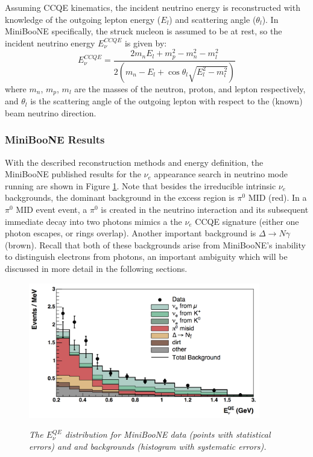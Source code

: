 Assuming CCQE kinematics, the incident neutrino energy is reconstructed with knowledge of the outgoing lepton energy ($E_l$) and scattering angle ($\theta_l$). In MiniBooNE specifically, the struck nucleon is assumed to be at rest, so the incident neutrino energy $E_\nu^{CCQE}$ is given by:
\begin{equation}\label{MB_CCQE_formula}
E_\nu^{CCQE} = \frac{2m_nE_l+m_p^2-m_n^2-m_l^2}{2(m_n-E_l+\cos\theta_l\sqrt{E_l^2-m_l^2})}
\end{equation}
where $m_n$, $m_p$, $m_l$ are the masses of the neutron, proton, and lepton respectively, and $\theta_l$ is the scattering angle of the outgoing lepton with respect to the (known) beam neutrino direction.\\

\subsubsection{MiniBooNE Results}
With the described reconstruction methods and energy definition, the MiniBooNE published results \cite{MBLEEPaper} for the $\nu_e$ appearance search in neutrino mode running are shown in Figure \ref{MB_published_stackedhisto_fig}. Note that besides the irreducible intrinsic $\nu_e$ backgrounds, the dominant background in the excess region is $\pi^0$ MID (red). In a $\pi^0$ MID event event, a $\pi^0$ is created in the neutrino interaction and its subsequent immediate decay into two photons mimics a the $\nu_e$ CCQE signature (either one photon escapes, or rings overlap). Another important background is $\Delta\rightarrow N\gamma$ (brown). Recall that both of these backgrounds arise from MiniBooNE's inability to distinguish electrons from photons, an important ambiguity which will be discussed in more detail in the following sections.\\


\begin{figure}[ht!]
\centering
	\includegraphics[width=0.9\textwidth]{Figures/MB_published_stackedhisto.png} \\
\caption{\textit{The $E_\nu^{QE}$ distribution for MiniBooNE data (points with statistical errors) and and backgrounds (histogram with systematic errors).}}\label{MB_published_stackedhisto_fig}
\end{figure}


